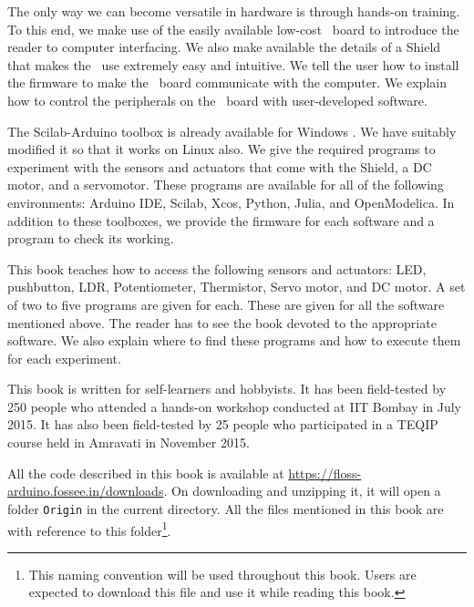The only way we can become versatile in hardware is through hands-on
training. To this end, we make use of the easily available low-cost
\arduino\ board to introduce the reader to computer interfacing. We
also make available the details of a Shield that makes the
\arduino\ use extremely easy and intuitive. We tell the user how to
install the firmware to make the \arduino\ board communicate with the
computer. We explain how to control the peripherals on the
\arduino\ board with user-developed software.

The Scilab-Arduino toolbox is already available for Windows
\cite{scilab-arduino}. We have suitably modified it so that it works
on Linux also. We give the required programs to experiment with the
sensors and actuators that come with the Shield, a DC motor, and a
servomotor. These programs are available for all of the following
environments: Arduino IDE, Scilab, Xcos, Python, Julia, and
OpenModelica. In addition to these toolboxes, we provide the firmware
for each software and a program to check its working.

This book teaches how to access the following sensors and actuators:
LED, pushbutton, LDR, Potentiometer, Thermistor, Servo motor, and DC motor. A set of two to five programs are given for each. These are given for all the
software mentioned above. The reader has to see the book devoted to
the appropriate software. We also explain where to find these
programs and how to execute them for each experiment.

This book is written for self-learners and hobbyists. It has been
field-tested by 250 people who attended a hands-on workshop conducted
at IIT Bombay in July 2015. It has also been field-tested by 25
people who participated in a TEQIP course held in Amravati in November
2015.

All the code described in this book is available at
\url{https://floss-arduino.fossee.in/downloads}.  On
downloading and unzipping it, it will open a folder {\tt Origin} in
the current directory.  All the files mentioned in this book are
with reference to this folder\footnote{\label{fn:file-loc}This naming
  convention will be used throughout this book.  Users are expected to
  download this file and use it while reading this book.}.
